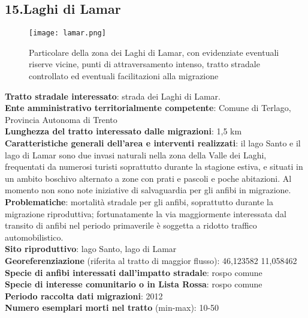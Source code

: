\documentclass[11pt,a4paper,twoside]{memoir}
\begin{document}
\newpage
\begin{tcolorbox}[breakable,colback=white,colframe=green,width=10cm]
\subsection{15.Laghi di Lamar}
\end{tcolorbox}

\begin{figure}[H]
\label{fig:map_lamar}
\centering
  \texttt{[image: lamar.png]}
\caption{Particolare della zona dei Laghi di Lamar, con evidenziate eventuali riserve vicine, punti di attraversamento intenso, tratto stradale controllato ed eventuali facilitazioni alla migrazione}
\end{figure}

\textbf{Tratto stradale interessato}: strada dei Laghi di Lamar. \\
\textbf{Ente amministrativo territorialmente competente}: Comune di Terlago, Provincia Autonoma di Trento \\
\textbf{Lunghezza del tratto interessato dalle migrazioni}: 1,5 km \\
\textbf{Caratteristiche generali dell’area e interventi realizzati}: il lago Santo e il lago di Lamar sono due invasi naturali nella zona della Valle dei Laghi, frequentati da numerosi turisti soprattutto durante la stagione estiva, e situati in un ambito boschivo alternato a zone con prati e pascoli e poche abitazioni. Al momento non sono note iniziative di salvaguardia per gli anfibi in migrazione. \\
\textbf{Problematiche}: mortalità stradale per gli anfibi, soprattutto durante la migrazione riproduttiva; fortunatamente la via maggiormente interessata dal transito di anfibi nel periodo primaverile è soggetta a ridotto traffico automobilistico. \\
\textbf{Sito riproduttivo}: lago Santo, lago di Lamar \\
\textbf{Georeferenziazione} (riferita al tratto di maggior flusso): 46,123582 11,058462 \\
\textbf{Specie di anfibi interessati dall’impatto stradale}: rospo comune \\
\textbf{Specie di interesse comunitario o in Lista Rossa}: rospo comune \\
\textbf{Periodo raccolta dati migrazioni}: 2012 \\
\textbf{Numero esemplari morti nel tratto} (min-max): 10-50 \\
\end{document}
